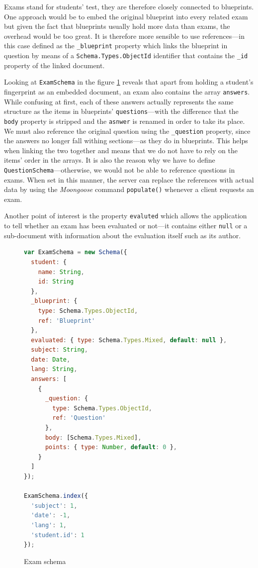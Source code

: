 \documentclass[thesis=M,english,hidelinks]{FITthesis}[2012/10/20]
\newcommand{\code}{\texttt}
\begin{document}
Exams stand for students' test, they are therefore closely connected to blueprints. One approach would be to embed the original blueprint into every related exam but given the fact that blueprints usually hold more data than exams, the overhead would be too great. It is therefore more sensible to use references---in this case defined as the \code{\_blueprint} property which links the blueprint in question by means of a \code{Schema.Types.ObjectId} identifier that contains the \code{\_id} property of the linked document.

Looking at \code{ExamSchema} in the figure \ref{fig:exam_schema} reveals that apart from holding a student's fingerprint as an embedded document, an exam also contains the array \code{answers}. While confusing at first, each of these answers actually represents the same structure as the items in blueprints' \code{questions}---with the difference that the \code{body} property is stripped and the \code{asnwer} is renamed in order to take its place. We must also reference the original question using the \code{\_question} property, since the answers no longer fall withing sections---as they do in blueprints. This helps when linking the two together and means that we do not have to rely on the items' order in the arrays. It is also the reason why we have to define \code{QuestionSchema}---otherwise, we would not be able to reference questions in exams. When set in this manner, the server can replace the references with actual data by using the \textit{Moongoose} command \code{populate()} whenever a client requests an exam.

Another point of interest is the property \code{evaluted} which allows the application to tell whether an exam has been evaluated or not---it contains either \code{null} or a sub-document with information about the evaluation itself such as its author.

\begin{figure}
  \begin{lstlisting}[language=JavaScript]
var ExamSchema = new Schema({
  student: {
    name: String,
    id: String
  },
  _blueprint: {
    type: Schema.Types.ObjectId,
    ref: 'Blueprint'
  },
  evaluated: { type: Schema.Types.Mixed, default: null },
  subject: String,
  date: Date,
  lang: String,
  answers: [
    {
      _question: {
        type: Schema.Types.ObjectId,
        ref: 'Question'
      },
      body: [Schema.Types.Mixed],
      points: { type: Number, default: 0 },
    }
  ]
});

ExamSchema.index({
  'subject': 1,
  'date': -1,
  'lang': 1,
  'student.id': 1
});
  \end{lstlisting}
  \caption{Exam schema}
  \label{fig:exam_schema}
\end{figure}
\end{document}

